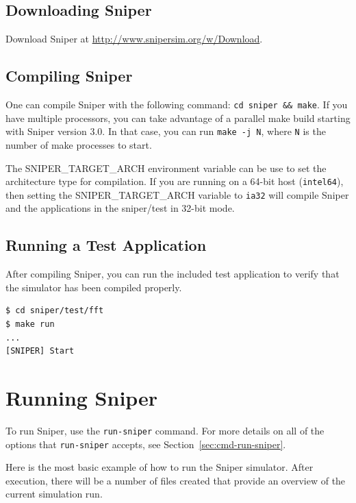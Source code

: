 \documentclass[a4paper,11pt,titlepage]{article}
\newcommand{\sourcecode}[1]{{\tt #1}}
\newcommand{\cmd}[1]{{\tt #1}}
\begin{document}
\subsection{Downloading Sniper}
\label{sec:download}

Download Sniper at \url{http://www.snipersim.org/w/Download}.

\subsection{Compiling Sniper}

One can compile Sniper with the following command: \sourcecode{cd sniper \&\& make}.  If you have multiple processors, you can take advantage of a parallel make build starting with Sniper version 3.0.  In that case, you can run \sourcecode{make -j N}, where \sourcecode{N} is the number of make processes to start.

The SNIPER\_TARGET\_ARCH environment variable can be use to set the architecture type for compilation. If you are running on a 64-bit host (\cmd{intel64}), then
setting the SNIPER\_TARGET\_ARCH variable to \cmd{ia32} will compile Sniper and the applications in the {sniper/test} in 32-bit mode.

\subsection{Running a Test Application}

After compiling Sniper, you can run the included test application to verify that the simulator
has been compiled properly.

\belowcaptionskip=-10pt
\begin{lstlisting}[label=run-test-app,caption=Running an included application,rulecolor=\color{DarkSlateBlue},language=Bash,deletekeywords=test]
$ cd sniper/test/fft
$ make run
...
[SNIPER] Start
\end{lstlisting}

\section{Running Sniper}

To run Sniper, use the \cmd{run-sniper} command. For more details on all of the options that \cmd{run-sniper}
accepts, see Section~\ref{sec:cmd-run-sniper}.

Here is the most basic example of how to run the Sniper simulator.  After execution, there will be
a number of files created that provide an overview of the current simulation run.
\end{document}

